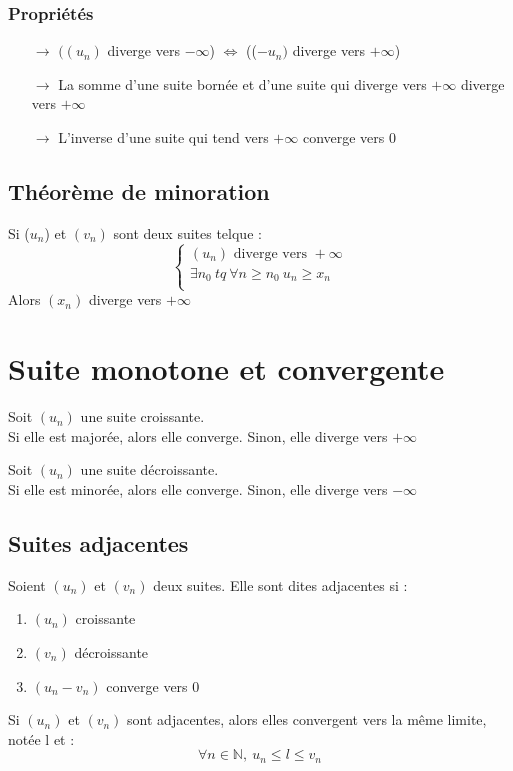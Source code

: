 \subsubsection{Propriétés}
\begin{itemize}
 \item[$\rightarrow$] $((u_n)$ diverge vers $-\infty$) $\Leftrightarrow$ (($-u_n)$ diverge vers $+\infty$)
 \item[$\rightarrow$] La somme d'une suite bornée et d'une suite qui diverge vers $+\infty$ diverge vers $+\infty$
 \item[$\rightarrow$] L'inverse d'une suite qui tend vers $+\infty$ converge vers 0
\end{itemize}
\subsection{Théorème de minoration}
\begin{theo}
 Si ($u_n$) et $(v_n)$ sont deux suites telque :
$$\left\{\begin{array}{l}
    (u_n) \mbox{ diverge vers } +\infty \\
    \exists n_0~ tq~ \forall n \geq n_0~ u_n \geq x_n\\
  \end{array}\right.$$
Alors $(x_n)$ diverge vers $+\infty$
\end{theo}
\section{Suite monotone et convergente}
\begin{theo}
Soit $(u_n)$ une suite croissante.\\
Si elle est majorée, alors elle converge. Sinon, elle diverge vers $+\infty$
\end{theo}
\begin{theo}
Soit $(u_n)$ une suite décroissante.\\
Si elle est minorée, alors elle converge. Sinon, elle diverge vers $-\infty$
\end{theo}
\subsection{Suites adjacentes}
\begin{de}
Soient $(u_n)$ et $(v_n)$ deux suites. Elle sont dites adjacentes si : 
\begin{enumerate}
 \item $(u_n)$ croissante
 \item $(v_n)$ décroissante
 \item $(u_n - v_n)$ converge vers 0
\end{enumerate}
\end{de}
\begin{prop}
Si $(u_n)$ et $(v_n)$ sont adjacentes, alors elles convergent vers la même limite, notée l et : 
$$\forall n \in \mathbb{N},~ u_n \leq l \leq v_n $$
\end{prop}
